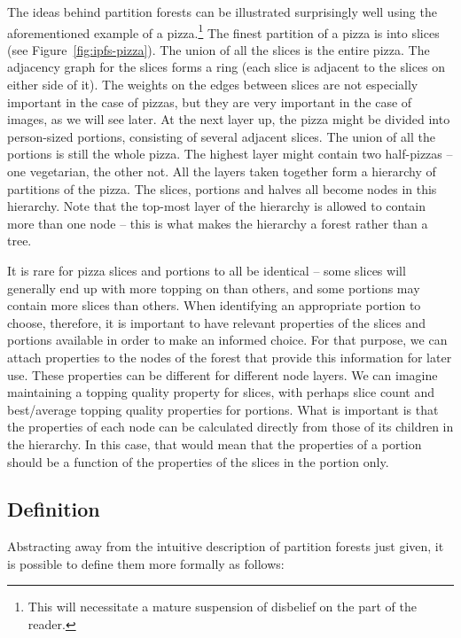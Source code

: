 The ideas behind partition forests can be illustrated surprisingly well using the aforementioned example of a pizza.\footnote{This will necessitate a mature suspension of disbelief on the part of the reader.} The finest partition of a pizza is into slices (see Figure~\ref{fig:ipfs-pizza}). The union of all the slices is the entire pizza. The adjacency graph for the slices forms a ring (each slice is adjacent to the slices on either side of it). The weights on the edges between slices are not especially important in the case of pizzas, but they are very important in the case of images, as we will see later. At the next layer up, the pizza might be divided into person-sized portions, consisting of several adjacent slices. The union of all the portions is still the whole pizza. The highest layer might contain two half-pizzas -- one vegetarian, the other not. All the layers taken together form a hierarchy of partitions of the pizza. The slices, portions and halves all become nodes in this hierarchy. Note that the top-most layer of the hierarchy is allowed to contain more than one node -- this is what makes the hierarchy a forest rather than a tree.


It is rare for pizza slices and portions to all be identical -- some slices will generally end up with more topping on than others, and some portions may contain more slices than others. When identifying an appropriate portion to choose, therefore, it is important to have relevant properties of the slices and portions available in order to make an informed choice. For that purpose, we can attach properties to the nodes of the forest that provide this information for later use. These properties can be different for different node layers. We can imagine maintaining a topping quality property for slices, with perhaps slice count and best/average topping quality properties for portions. What is important is that the properties of each node can be calculated directly from those of its children in the hierarchy. In this case, that would mean that the properties of a portion should be a function of the properties of the slices in the portion only.

\subsection{Definition}

Abstracting away from the intuitive description of partition forests just given, it is possible to define them more formally as follows:

